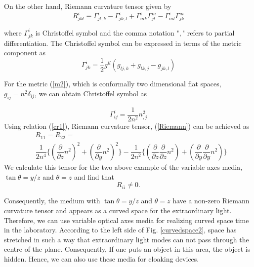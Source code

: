 \documentclass[9pt,twocolumn,twoside]{osajnl}
\begin{document}
On the other hand, Riemann curvature tensor given by \cite{leonhardt2012geometry}
\begin{equation}\label{Riemann}
R^{i}_{jkl}\equiv \Gamma^{i}_{jl,k}-\Gamma^{i}_{jk,l}+\Gamma^{i}_{mk}\Gamma^{m}_{jl}-\Gamma^{i}_{ml}\Gamma^{m}_{jk}
\end{equation}

where $\Gamma^{i}_{jk}$ is Christoffel symbol and the comma notation "$,$" refers to partial differentiation.  The Christoffel symbol can be expressed in terms of the metric component as
\begin{equation}\label{cr}
\Gamma^{i}_{jk}=\dfrac{1}{2} g^{il}(g_{lj,k}+g_{lk,j}-g_{jk,l})
\end{equation}

For the metric (\ref{m2}), which is conformally two dimensional flat spaces, $g_{ij}=n^{2}\delta_{ij}$, we can obtain Christoffel symbol as

\begin{equation}\label{cr1}
\Gamma^{i}_{ij}=\dfrac{1}{2n^{2}}n^{2}_{,j}
\end{equation}
Using relation (\ref{cr1}), Riemann curvature tensor, (\ref{Riemann}) can be achieved as 
\begin{equation}
\begin{split}
&R_{11}=R_{22}=\\
&\dfrac{1}{2n^{4}} \lbrace (\dfrac{\partial}{\partial z}n^{2})^{2} +(\dfrac{\partial}{\partial y}n^{2})^{2}\rbrace -\dfrac{1}{2n^{2}}\lbrace(\dfrac{\partial}{\partial z}\dfrac{\partial}{\partial z}n^{2})+(\dfrac{\partial}{\partial y}\dfrac{\partial}{\partial y}n^{2})\rbrace
\end{split}
\end{equation}
We calculate this tensor for the two above example of the variable axes media, $\tan{\theta}=y/z$ and $\theta=z$ and find that 
 \begin{equation}
R_{ii}\neq 0.
\end{equation}

Consequently, the medium with $\tan{\theta}=y/z$ and $\theta=z$ have a non-zero Riemann curvature tensor and appears as a curved space for the extraordinary light. Therefore, we can use variable optical axes media for realizing curved space time in the laboratory. According to the left side of Fig. \ref{curvedspace2}, space has stretched in such a way that extraordinary light modes can not pass through the centre of the plane. Consequently, If one puts an object in this area, the object is hidden. Hence, we can also use these media for cloaking devices.
\end{document}
